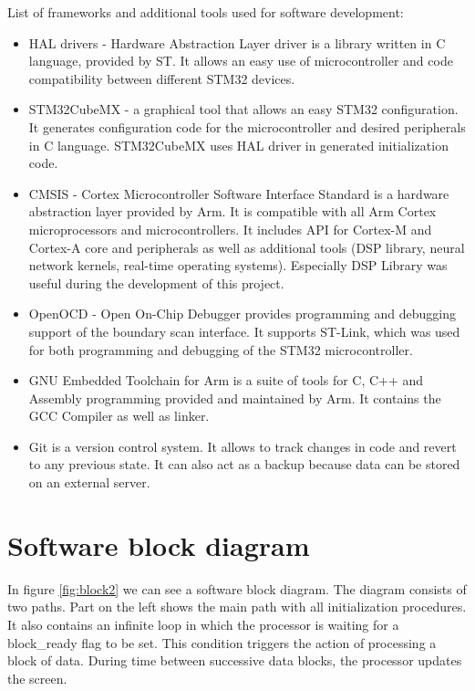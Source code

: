\documentclass[a4paper,twoside,12pt]{book}
\begin{document}
List of frameworks and additional tools used for software development:

\begin{itemize}
    \item HAL drivers
    - Hardware Abstraction Layer driver is a library written in C language, provided by ST.
    It allows an easy use of microcontroller and code compatibility between different STM32 devices.
    \cite{ST:HAL}
    \item STM32CubeMX
    - a graphical tool that allows an easy STM32 configuration.
    It generates configuration code for the microcontroller and desired peripherals in C language.
    STM32CubeMX uses HAL driver in generated initialization code.
    \item CMSIS
    - Cortex Microcontroller Software Interface Standard
    is a hardware abstraction layer provided by Arm.
    It is compatible with all Arm Cortex microprocessors and microcontrollers.
    It includes API for Cortex-M and Cortex-A core and peripherals as well as additional tools
    (DSP library, neural network kernels, real-time operating systems).
    Especially DSP Library was useful during the development of this project.
    \cite{CMSIS_DSP}
    \item OpenOCD
    - Open On-Chip Debugger provides programming and debugging support of the boundary scan interface.
    It supports ST-Link, which was used for both programming and debugging of the STM32 microcontroller.
    \item GNU Embedded Toolchain for Arm
    is a suite of tools for C, C++ and Assembly programming provided and maintained by Arm.
    It contains the GCC Compiler as well as linker.
    \item Git
    is a version control system. It allows to track changes in code
    and revert to any previous state.
    It can also act as a backup because data can be stored on an external server.
\end{itemize}

\section{Software block diagram}
In figure \ref{fig:block2} we can see a software block diagram.
The diagram consists of two paths.
Part on the left shows the main path with all initialization procedures.
It also contains an infinite loop in which the processor is waiting
for a block\_ready flag to be set.
This condition triggers the action of processing a block of data.
During time between successive data blocks,
the processor updates the screen.
\end{document}
